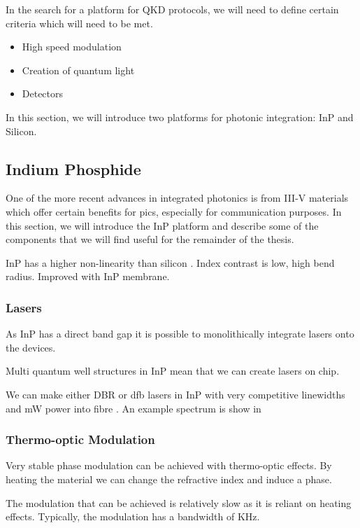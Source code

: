 In the search for a platform for \ac{QKD} protocols, we will need to define certain criteria which will need to be met.

\begin{itemize}
	\item High speed modulation
	\item Creation of quantum light
	\item Detectors
\end{itemize}

In this section, we will introduce two platforms for photonic integration: \Ac{InP} and Silicon.

\subsection{Indium Phosphide}

One of the more recent advances in integrated photonics is from III-V materials which offer certain benefits for \acp{pic}, especially for communication purposes. In this section, we will introduce the \acl{InP} platform and describe some of the components that we will find useful for the remainder of the thesis.

\Ac{InP} has a higher non-linearity than silicon \cite{Kumar2019}. Index contrast is low, high bend radius. Improved with InP membrane.

\subsubsection*{Lasers}

As \ac{InP} has a direct band gap it is possible to monolithically integrate lasers onto the devices. 

Multi quantum well structures in \ac{InP} mean that we can create lasers on chip.

We can make either \ac{DBR} or \ac{dfb} lasers in \ac{InP} with very competitive linewidths and mW power into fibre \cite{jeppix}. An example spectrum is show in 

\subsubsection*{Thermo-optic Modulation}

Very stable phase modulation can be achieved with thermo-optic effects. By heating the material we can change the refractive index and induce a phase.

The modulation that can be achieved is relatively slow as it is reliant on heating effects. Typically, the modulation has a bandwidth of KHz. 

